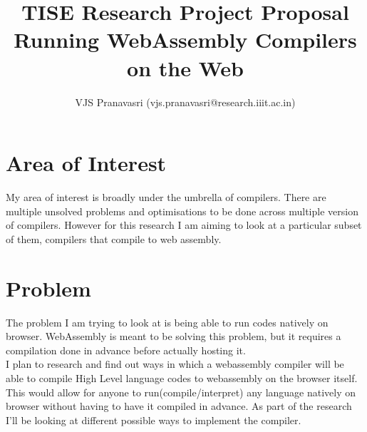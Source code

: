 \documentclass[11pt,letterpaper]{article}
\newcommand{\blue}[1]{\textcolor{RoyalBlue}{#1}}
\newcommand{\instructions}[1]{\blue{\textit{#1}}}
\renewcommand{\instructions}[1]{}
\begin{document}
\title{TISE Research Project Proposal \\
 Running WebAssembly Compilers on the Web}
\author{VJS Pranavasri (vjs.pranavasri@research.iiit.ac.in)}
\maketitle



\instructions{If you are taking CS447 for 4 hours credit, you need to
  either do a research project or a literature review.\\
This is a \LaTeX template for the initial proposal for the research project,  but should also give you a start on the final report.\\
The blue pieces of text  in this template are either instructions ({\tt$\backslash$instructions\{...\}}) or indicate where you need to fill in something ({\tt$\backslash$fillme\{...\}}).  
You should replace all the {\tt$\backslash$fillme\{...\}} commands with your own text.
To make the instructions disappear, please uncomment the
\begin{center}
{\tt$\backslash$renewcommand\{$\backslash$instructions\}[1]\{\}}\\
\end{center}
lines in the preamble (just above  {\tt $\backslash$begin\{document\}} of this .tex file) by removing the leading \% marks, 
recompile (run \LaTeX again) and submit the PDF on Compass.}

\section*{Area of Interest}
My area of interest is broadly under the umbrella of compilers. There are multiple unsolved problems and optimisations to be done across multiple version of compilers. However for this research I am aiming to look at a particular subset of them, compilers that compile to web assembly.

\section*{Problem}
The problem I am trying to look at is being able to run codes natively on browser. WebAssembly is meant to be solving this problem, but it requires a compilation done in advance before actually hosting it. \\
I plan to research and find out ways in which a webassembly compiler will be able to compile High Level language codes to webassembly on the browser itself. This would allow for anyone to run(compile/interpret) any language natively on browser without having to have it compiled in advance. 
As part of the research I'll be looking at different possible ways to implement the compiler.
\end{document}
